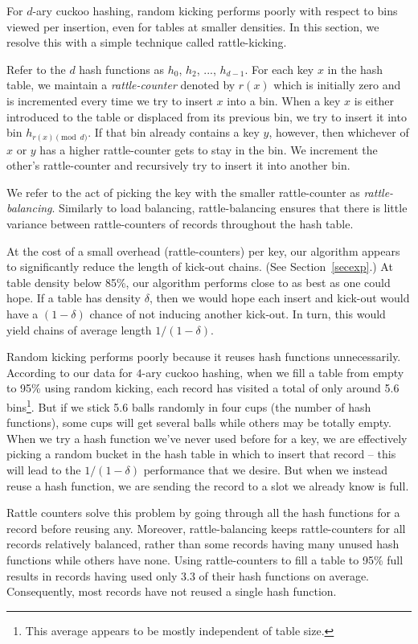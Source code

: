 \documentclass{sig-alternate-05-2015}
\begin{document}
For $d$-ary cuckoo hashing, random kicking performs poorly with
respect to bins viewed per insertion, even for tables at smaller
densities. In this section, we resolve this with a simple technique
called rattle-kicking.

Refer to the $d$ hash functions as $h_0$, $h_2$, ..., $h_{d-1}$. For
each key $x$ in the hash table, we maintain a \emph{rattle-counter}
denoted by $r(x)$ which is initially zero and is incremented every
time we try to insert $x$ into a bin. When a key $x$ is either
introduced to the table or displaced from its previous bin, we try to
insert it into bin $h_{r(x) \pmod d}$. If that bin already contains a
key $y$, however, then whichever of $x$ or $y$ has a higher
rattle-counter gets to stay in the bin. We increment the other's
rattle-counter and recursively try to insert it into another bin.



We refer to the act of picking the key with the smaller rattle-counter
as \emph{rattle-balancing}. Similarly to load balancing,
rattle-balancing ensures that there is little variance between
rattle-counters of records throughout the hash table.

At the cost of a small overhead (rattle-counters) per key, our
algorithm appears to significantly reduce the length of kick-out
chains. (See Section~\ref{secexp}.) At table density below 85\%, our
algorithm performs close to as best as one could hope. If a table has
density $\delta$, then we would hope each insert and kick-out would
have a $(1-\delta)$ chance of not inducing another kick-out. In turn,
this would yield chains of average length $1/(1-\delta)$.

Random kicking performs poorly because it reuses hash functions
unnecessarily.  According to our data for $4$-ary cuckoo hashing, when
we fill a table from empty to 95\% using random kicking, each record
has visited a total of only around 5.6 bins\footnote{This average
  appears to be mostly independent of table size.}. But if we stick
5.6 balls randomly in four cups (the number of hash functions), some
cups will get several balls while others may be totally empty. When we
try a hash function we've never used before for a key, we are
effectively picking a random bucket in the hash table in which to
insert that record -- this will lead to the $1/(1-\delta)$ performance that
we desire. But when we instead reuse a hash function, we are sending
the record to a slot we already know is full.

Rattle counters solve this problem by going through all the hash
functions for a record before reusing any. Moreover, rattle-balancing
keeps rattle-counters for all records relatively balanced, rather than
some records having many unused hash functions while others have
none. Using rattle-counters to fill a table to 95\% full results in
records having used only 3.3 of their hash functions on
average. Consequently, most records have not reused a single hash
function.
\end{document}
